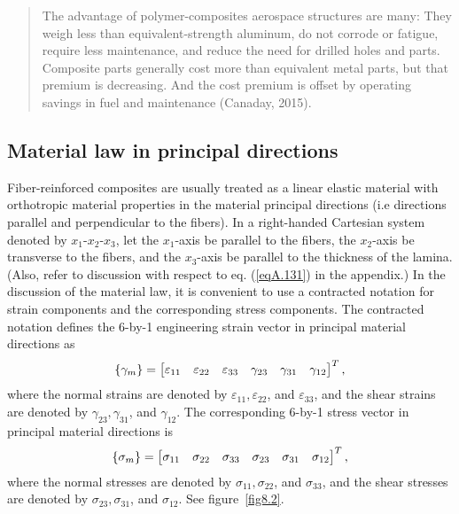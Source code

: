\documentclass{AeroStructure-ERJohnson}
\begin{document}
\begin{quote}
The advantage of polymer-composites aerospace structures are many:
They weigh less than equivalent-strength aluminum, do not corrode
or fatigue, require less maintenance, and reduce the need for
drilled holes and parts. Composite parts generally cost more than
equivalent metal parts, but that premium is decreasing. And the
cost premium is offset by operating savings in fuel and
maintenance (Canaday, 2015).
\end{quote}

\subsection{Material law in principal directions}\label{sec8.1.1}

Fiber-reinforced composites are usually treated as a linear
elastic material with orthotropic material properties in the
material principal directions (i.e directions parallel and
perpendicular to the fibers). In a right-handed Cartesian system
denoted by $x_1$-$x_2$-$x_3$, let the $x_1$-axis be parallel to
the fibers, the $x_2$-axis be transverse to the fibers, and the
$x_3$-axis be parallel to the thickness of the lamina. (Also,
refer to discussion with respect to eq. (\ref{eqA.131}) in the
appendix.) In the discussion of the material law, it is convenient
to use a contracted notation for strain components and the
corresponding stress components. The contracted notation defines
the 6-by-1 engineering strain vector in principal material
directions as
\begin{align}\label{eq8.1}
\left\{\gamma_m \right\}=\left[\begin{array}{@{}llllll@{}} \varepsilon_{11} & \varepsilon_{22} & \varepsilon_{33} & \gamma_{23} & \gamma_{31} & \gamma_{12} \end{array}\right]^{T} ,
\end{align}
where the normal strains are denoted by $\varepsilon_{11},
\varepsilon_{22}$, and $\varepsilon_{33}$, and the shear strains are
denoted by $\gamma_{23}, \gamma_{31}$, and $\gamma_{12}$. The
corresponding 6-by-1 stress vector in principal material
directions is
\begin{align}\label{eq8.2}
\left\{\sigma_{m}\right\}=\left[\begin{array}{@{}llllll@{}}
\sigma_{11} & \sigma_{22} & \sigma_{33} & \sigma_{23} &
\sigma_{31} & \sigma_{12} \end{array}\right]^{T} ,
\end{align}
where the normal stresses are denoted by $\sigma_{11},
\sigma_{22}$, and $\sigma_{33}$, and the shear stresses are
denoted by $\sigma_{23}, \sigma_{31}$, and $\sigma_{12}$. See
figure~\ref{fig8.2}.
\end{document}
